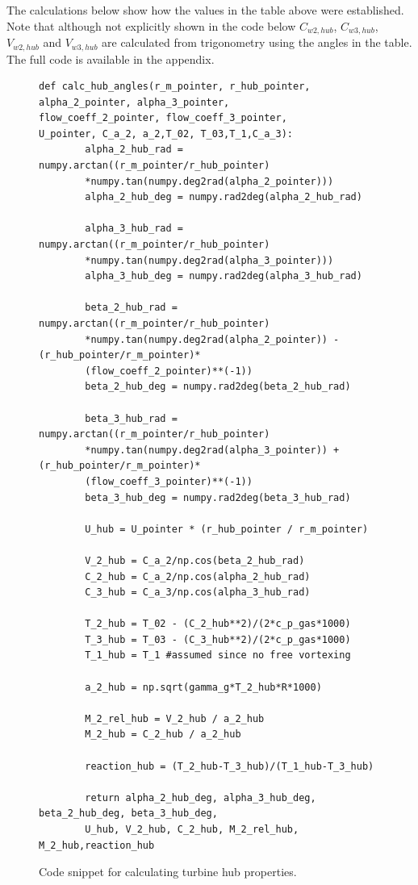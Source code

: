 \documentclass[12pt, letter]{report}
\begin{document}
The calculations below show how the values in the table above were established. Note that although not explicitly shown in the code below $C_{w2,hub}$, $C_{w3,hub}$, $V_{w2,hub}$ and $V_{w3,hub}$  are calculated from trigonometry using the angles in the table. The full code is available in the appendix.

\begin{figure}[H]
    \begin{verbatim}
def calc_hub_angles(r_m_pointer, r_hub_pointer, alpha_2_pointer, alpha_3_pointer, 
flow_coeff_2_pointer, flow_coeff_3_pointer,
U_pointer, C_a_2, a_2,T_02, T_03,T_1,C_a_3):
        alpha_2_hub_rad = numpy.arctan((r_m_pointer/r_hub_pointer) 
        *numpy.tan(numpy.deg2rad(alpha_2_pointer)))
        alpha_2_hub_deg = numpy.rad2deg(alpha_2_hub_rad)
    
        alpha_3_hub_rad = numpy.arctan((r_m_pointer/r_hub_pointer) 
        *numpy.tan(numpy.deg2rad(alpha_3_pointer)))
        alpha_3_hub_deg = numpy.rad2deg(alpha_3_hub_rad)
    
        beta_2_hub_rad = numpy.arctan((r_m_pointer/r_hub_pointer) 
        *numpy.tan(numpy.deg2rad(alpha_2_pointer)) - (r_hub_pointer/r_m_pointer)*
        (flow_coeff_2_pointer)**(-1))
        beta_2_hub_deg = numpy.rad2deg(beta_2_hub_rad)
    
        beta_3_hub_rad = numpy.arctan((r_m_pointer/r_hub_pointer) 
        *numpy.tan(numpy.deg2rad(alpha_3_pointer)) + (r_hub_pointer/r_m_pointer)*
        (flow_coeff_3_pointer)**(-1))
        beta_3_hub_deg = numpy.rad2deg(beta_3_hub_rad)

        U_hub = U_pointer * (r_hub_pointer / r_m_pointer)

        V_2_hub = C_a_2/np.cos(beta_2_hub_rad)
        C_2_hub = C_a_2/np.cos(alpha_2_hub_rad)
        C_3_hub = C_a_3/np.cos(alpha_3_hub_rad)
        
        T_2_hub = T_02 - (C_2_hub**2)/(2*c_p_gas*1000)
        T_3_hub = T_03 - (C_3_hub**2)/(2*c_p_gas*1000)
        T_1_hub = T_1 #assumed since no free vortexing

        a_2_hub = np.sqrt(gamma_g*T_2_hub*R*1000)

        M_2_rel_hub = V_2_hub / a_2_hub 
        M_2_hub = C_2_hub / a_2_hub

        reaction_hub = (T_2_hub-T_3_hub)/(T_1_hub-T_3_hub)

        return alpha_2_hub_deg, alpha_3_hub_deg, beta_2_hub_deg, beta_3_hub_deg,
        U_hub, V_2_hub, C_2_hub, M_2_rel_hub, M_2_hub,reaction_hub
    \end{verbatim}
    \caption{Code snippet for calculating turbine hub properties.}
    \label{fig:code_turbine_hub}
\end{figure}
\end{document}
